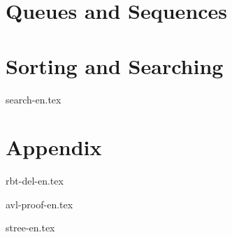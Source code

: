 \documentclass[a4paper,twoside]{book} %
\begin{document}





\part{Queues and Sequences}




\part{Sorting and Searching}


{search-en.tex}

\part{Appendix}
\appendix
\noappendicestocpagenum
\addappheadtotoc



{rbt-del-en.tex}

{avl-proof-en.tex}

{stree-en.tex}



\printindex
\end{document}
